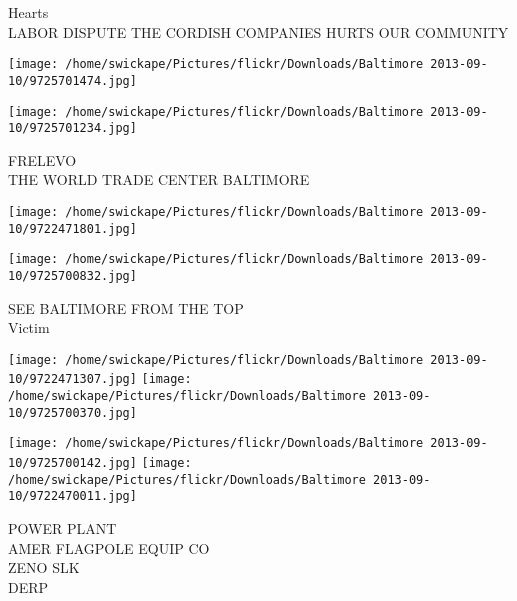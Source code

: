 \documentclass[10pt,letterpaper]{article}
\begin{document}
Hearts\\
LABOR DISPUTE THE CORDISH COMPANIES HURTS OUR COMMUNITY\\
\pagebreak

\texttt{[image: /home/swickape/Pictures/flickr/Downloads/Baltimore 2013-09-10/9725701474.jpg]}

\vspace{0.25in}
\texttt{[image: /home/swickape/Pictures/flickr/Downloads/Baltimore 2013-09-10/9725701234.jpg]}

FRELEVO\\
THE WORLD TRADE CENTER BALTIMORE\\
\pagebreak

\texttt{[image: /home/swickape/Pictures/flickr/Downloads/Baltimore 2013-09-10/9722471801.jpg]}

\vspace{0.25in}
\texttt{[image: /home/swickape/Pictures/flickr/Downloads/Baltimore 2013-09-10/9725700832.jpg]}

SEE BALTIMORE FROM THE TOP\\
Victim\\
\pagebreak

\texttt{[image: /home/swickape/Pictures/flickr/Downloads/Baltimore 2013-09-10/9722471307.jpg]}
\texttt{[image: /home/swickape/Pictures/flickr/Downloads/Baltimore 2013-09-10/9725700370.jpg]}

\texttt{[image: /home/swickape/Pictures/flickr/Downloads/Baltimore 2013-09-10/9725700142.jpg]}
\texttt{[image: /home/swickape/Pictures/flickr/Downloads/Baltimore 2013-09-10/9722470011.jpg]}

POWER PLANT\\
AMER FLAGPOLE EQUIP CO\\
ZENO SLK\\
DERP\\
\pagebreak
\end{document}
